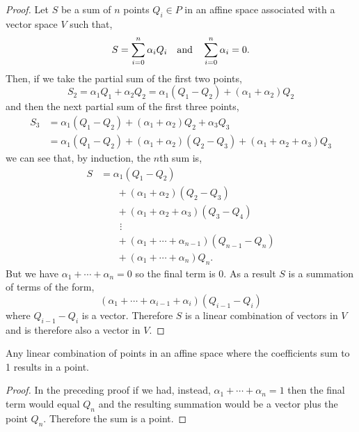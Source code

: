 \documentclass[MathsNotesBase.tex]{subfiles}
\begin{document}
{	\bigskip
	\begin{proof}
		Let $S$ be a sum of $n$ points ${ Q_i \in P }$ in an affine space associated with a vector space $V$ such that,
		\[ S = \sum_{i=0}^n \alpha_i Q_i  \hspace{10pt}\text{and}\hspace{10pt} \sum_{i=0}^n \alpha_i = 0. \]
		Then, if we take the partial sum of the first two points,
		\[ S_2 = \alpha_1 Q_1 + \alpha_2 Q_2 = \alpha_1(Q_1 - Q_2) + (\alpha_1 + \alpha_2)Q_2 \]
		and then the next partial sum of the first three points,
		\begin{align*}
		S_3 &= \alpha_1(Q_1 - Q_2) + (\alpha_1 + \alpha_2)Q_2 + \alpha_3 Q_3 \\
		&= \alpha_1(Q_1 - Q_2) +  (\alpha_1 + \alpha_2)(Q_2 - Q_3) +  (\alpha_1 + \alpha_2 + \alpha_3) Q_3
		\end{align*}
		we can see that, by induction, the $n$th sum is,
		\begin{align*}
		S &= \alpha_1(Q_1 - Q_2) \\
		&\hspace{20pt} + (\alpha_1 + \alpha_2)(Q_2 - Q_3)\\
		&\hspace{20pt} + (\alpha_1 + \alpha_2 + \alpha_3)(Q_3 - Q_4)\\
		&\hspace{24pt} \vdots\\
		&\hspace{20pt} + (\alpha_1 + \cdots + \alpha_{n-1})(Q_{n-1} - Q_n)\\
		&\hspace{20pt} + (\alpha_1 + \cdots + \alpha_n)Q_n.
		\end{align*}
		But we have ${ \alpha_1 + \cdots + \alpha_n = 0 }$ so the final term is 0. As a result $S$ is a summation of terms of the form,
		\[ (\alpha_1 + \cdots + \alpha_{i-1} + \alpha_i)(Q_{i-1} - Q_i) \]
		where ${ Q_{i-1} - Q_i }$ is a vector. Therefore $S$ is a linear combination of vectors in $V$ and is therefore also a vector in $V$.
	\end{proof}
	\begin{corollary}
		\label{coro:sum_affine_points_with_coeffs_sum_to_one_are_vectors}
		Any linear combination of points in an affine space where the coefficients sum to 1 results in a point.
	\end{corollary}
	\begin{proof}
		In the preceding proof if we had, instead, ${ \alpha_1 + \cdots + \alpha_n = 1 }$ then the final term would equal $Q_n$ and the resulting summation would be a vector plus the point $Q_n$. Therefore the sum is a point.
	\end{proof}

}
\end{document}
